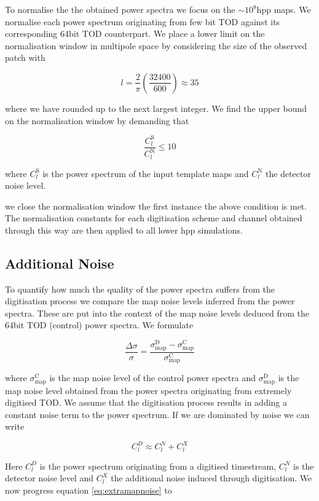 \documentclass[apj]{emulateapj}
\begin{document}
To normalise the the obtained power spectra we focus on the $\sim 10^8 \mathrm{hpp}$ maps. We normalise each power spectrum originating from few bit TOD against its corresponding 64bit TOD counterpart. We place a lower limit on the normalisation window in multipole space by considering the size of the observed patch with

\[ l = \frac{2}{\pi} \left( \frac{32400}{600} \right) \approx 35 \]

where we have rounded up to the next largest integer. We find the upper bound on the normalisation window by demanding that

\[ \frac{C_l^{\mathrm{S}}}{C_l^{\mathrm{N}}} \leq 10 \]

where $C_l^{\mathrm{S}}$ is the power spectrum of the input template maps and $C_l^{\mathrm{N}}$ the detector noise level.

we close the normalisation window the first instance the above condition is met. The normalisation constants for each digitisation scheme and channel obtained through this way are then applied to all lower hpp simulations.

\subsection{Additional Noise}
\label{subsec:additionalnoise}

To quantify how much the quality of the power spectra suffers from the digitisation process we compare the map noise levels inferred from the power spectra. These are put into the context of the map noise levels deduced from the 64bit TOD (control) power spectra. We formulate

\begin{equation} \label{eq:extramapnoise}
\frac{\Delta \sigma}{\sigma} = \frac{\sigma_{\mathrm{map}}^{\mathrm{D}}-\sigma_{\mathrm{map}}^{\mathrm{C}}}{\sigma_{\mathrm{map}}^{\mathrm{C}}}
\end{equation}

where $\sigma_{\mathrm{map}}^{\mathrm{C}}$ is the map noise level of the control power spectra and $\sigma_{\mathrm{map}}^{\mathrm{D}}$ is the map noise level obtained from the power spectra originating from extremely digitised TOD. We assume that the digitisation process results in adding a constant noise term to the power spectrum. If we are dominated by noise we can write

\[ C_l^D \approx C_l^N + C_l^X \]

Here $C_l^D$ is the power spectrum originating from a digitised timestream, $C_l^N$ is the detector noise level and $C_l^X$ the additional noise induced through digitisation. We now progress equation \ref{eq:extramapnoise} to
\end{document}
